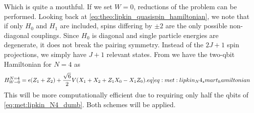 Which is quite a mouthful. If we set $W = 0$, reductions of the problem can be performed. Looking back at \cref{eq:theo:lipkin_quasispin_hamiltonian}, we note that if only $H_0$ and $H_1$ are included,  spins differing by $\pm2$ are the only possible non-diagonal couplings. Since $H_0$ is diagonal and single particle energies are degenerate, it does not break the pairing symmetry. Instead of the $2J+1$ spin projections, we simply have $J+1$ relevant states. From \citep{hlatshwayoSimulatingExcitedStates2022} we have the two-qbit Hamiltonian for $N=4$ as
\begin{align}
    H_{W=0}^{N=4} = \epsilon(Z_1 + Z_2) + \frac{\sqrt{6}}{2}V (X_1 + X_2 + Z_1 X_0 - X_1 Z_0). \label[eq]{eq:met:lipkin_N4_smart_hamiltonian}
\end{align}
This will be more computationally efficient due to requiring only half the qbits of \cref{eq:met:lipkin_N4_dumb}. Both schemes will be applied.

